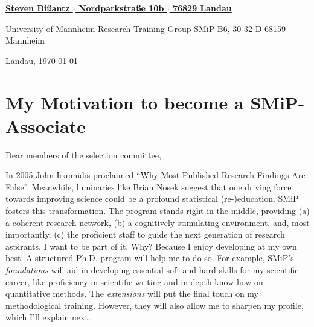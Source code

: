 \documentclass[11pt]{FreemanML}
\begin{document}
\begin{paracol}{2}

\switchcolumn %

\color{headings} 
\vspace{2cm}
\underline{\textbf{\footnotesize{Steven Bißantz $\cdot$ Nordparkstraße 10b $\cdot$ 76829 Landau}}}

\color{text}
\bigskip
\begin{leftbar}
University of Mannheim \newline
Research Training Group SMiP \newline
B6, 30-32 \newline
D-68159 Mannheim
\end{leftbar}

\switchcolumn

\vspace{5cm}
\begin{flushright}
Landau, \today
\end{flushright}
\end{paracol} %

\vspace{1cm}
\section*{My Motivation to become a SMiP-Associate}
\bigskip
Dear members of the selection committee,
\smallskip

\onehalfspacing

\lettrine[lines=3]{I}{}n 2005 John Ioannidis proclaimed \enquote{Why Most
Published Research Findings Are False}. Meanwhile, luminaries like Brian Nosek
suggest that one driving force towards improving science could be a profound
statistical (re-)education. SMiP fosters this transformation. The program
stands right in the middle, providing (a) a coherent research network, (b) a
cognitively stimulating environment, and, most importantly, (c) the proficient
staff to guide the next generation of research aspirants. I want to be part of
it. Why? Because I enjoy developing at my own best. A structured Ph.D. program
will help me to do so. For example, SMiP's \textit{foundations} will aid in
developing essential soft and hard skills for my scientific career, like
proficiency in scientific writing and in-depth know-how on quantitative
methods. The \textit{extensions} will put the final touch on my methodological
training. However, they will also allow me to sharpen my profile, which I'll
explain next. 
\end{document}
